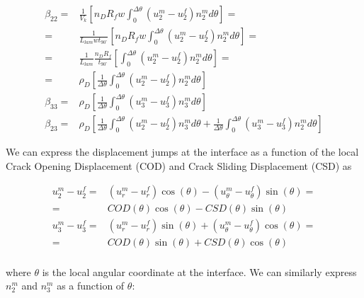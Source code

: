 \documentclass[review]{elsarticle}
\begin{document}
\begin{equation}\label{eq:betarho}
\begin{aligned}
\beta_{22}=&\frac{1}{V_{k}}\left[n_{D}R_{f}w\int_{0}^{\Delta\theta}\left(u_{2}^{m}-u_{2}^{f}\right)n_{2}^{m}d\theta\right]=\\
=&\frac{1}{L_{lam}wt_{90^{\circ}}}\left[n_{D}R_{f}w\int_{0}^{\Delta\theta}\left(u_{2}^{m}-u_{2}^{f}\right)n_{2}^{m}d\theta\right]=\\
=&\frac{1}{L_{lam}}\frac{n_{D}R_{f}}{t_{90^{\circ}}}\left[\int_{0}^{\Delta\theta}\left(u_{2}^{m}-u_{2}^{f}\right)n_{2}^{m}d\theta\right]=\\
=&\rho_{D}\left[\frac{1}{\Delta\theta}\int_{0}^{\Delta\theta}\left(u_{2}^{m}-u_{2}^{f}\right)n_{2}^{m}d\theta\right]\\
\beta_{33}=&\rho_{D}\left[\frac{1}{\Delta\theta}\int_{0}^{\Delta\theta}\left(u_{3}^{m}-u_{3}^{f}\right)n_{3}^{m}d\theta\right]\\
\beta_{23}=&\rho_{D}\left[\frac{1}{\Delta\theta}\int_{0}^{\Delta\theta}\left(u_{2}^{m}-u_{2}^{f}\right)n_{3}^{m}d\theta+\frac{1}{\Delta\theta}\int_{0}^{\Delta\theta}\left(u_{3}^{m}-u_{3}^{f}\right)n_{2}^{m}d\theta\right]
\end{aligned}
\end{equation}

We can express the displacement jumps at the interface as a function of the local Crack Opening Displacement (COD) and Crack Sliding Displacement (CSD) as

\begin{equation}
\begin{aligned}
u_{2}^{m}-u_{2}^{f}=&\left(u_{r}^{m}-u_{r}^{f}\right)\cos{\left(\theta\right)}-\left(u_{\theta}^{m}-u_{\theta}^{f}\right)\sin{\left(\theta\right)}=\\
=&COD\left(\theta\right)\cos{\left(\theta\right)}-CSD\left(\theta\right)\sin{\left(\theta\right)}\\
u_{3}^{m}-u_{3}^{f}=&\left(u_{r}^{m}-u_{r}^{f}\right)\sin{\left(\theta\right)}+\left(u_{\theta}^{m}-u_{\theta}^{f}\right)\cos{\left(\theta\right)}=\\
=&COD\left(\theta\right)\sin{\left(\theta\right)}+CSD\left(\theta\right)\cos{\left(\theta\right)}\\
\end{aligned}
\end{equation}

where $\theta$ is the local angular coordinate at the interface. We can similarly express $n_{2}^{m}$ and $n_{3}^{m}$ as a function of $\theta$:
\end{document}
